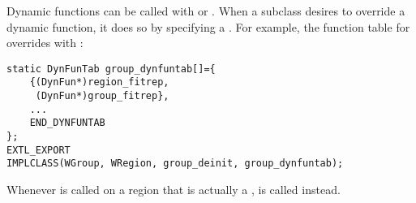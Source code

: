 Dynamic functions can be called with  or .
When a subclass desires to override a dynamic function, it does so by 
specifying a . For example, the function
table for  overrides  with 
:

\begin{verbatim}
static DynFunTab group_dynfuntab[]={
    {(DynFun*)region_fitrep,
     (DynFun*)group_fitrep},
    ...
    END_DYNFUNTAB
};
EXTL_EXPORT
IMPLCLASS(WGroup, WRegion, group_deinit, group_dynfuntab);
\end{verbatim}

Whenever  is called on a region that is actually a 
,  is called instead.
